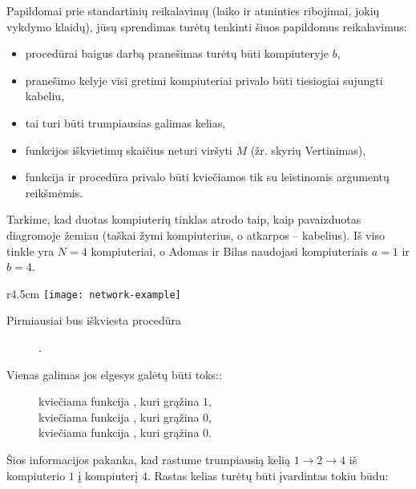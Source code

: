 \documentclass{boi2014-lt}
\begin{document}
    Papildomai prie standartinių reikalavimų (laiko ir atminties ribojimai,
    jokių vykdymo klaidų), jūsų sprendimas turėtų tenkinti šiuos papildomus
    reikalavimus:

    \begin{itemize}
        \item procedūrai  baigus darbą pranešimas turėtų būti
            kompiuteryje $b$,
        \item pranešimo kelyje visi gretimi kompiuteriai privalo būti tiesiogiai
            sujungti kabeliu,
        \item tai turi būti trumpiausias galimas kelias,
        \item funkcijos  iškvietimų skaičius neturi viršyti $M$
            (žr. skyrių Vertinimas),
        \item funkcija  ir procedūra  privalo būti
            kviečiamos tik su leistinomis argumentų reikšmėmis.
    \end{itemize}

    \Example
    Tarkime, kad duotas kompiuterių tinklas atrodo taip, kaip pavaizduotas
    diagromoje žemiau (taškai žymi kompiuterius, o atkarpos -- kabelius). Iš
    viso tinkle yra $N = 4$ kompiuteriai, o Adomas ir Bilas naudojasi
    kompiuteriais $a = 1$ ir $b = 4$.

    \begin{wrapfigure}[1]{r}{4.5cm}
        \texttt{[image: network-example]}
    \end{wrapfigure}

    Pirmiausiai bus iškviesta procedūra
    \begin{figure}[H]
        \centering
        .
    \end{figure}

    Vienas galimas jos elgesys galėtų būti toks::

    \begin{figure}[H]
        \centering
        kviečiama funkcija , kuri grąžina $1$, \\
        kviečiama funkcija , kuri grąžina $0$, \\
        kviečiama funkcija , kuri grąžina $0$.
    \end{figure}

    Šios informacijos pakanka, kad rastume trumpiausią kelią $1 \to 2 \to 4$ iš
    kompiuterio $1$ į kompiuterį $4$. Rastas kelias turėtų būti įvardintas tokiu
    būdu:
\end{document}
